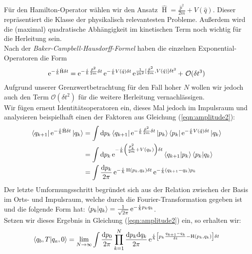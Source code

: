 Für den Hamilton-Operator wählen wir den Ansatz $\hat{\operatorname{H}} = \frac{\hat{p}^2}{2m} + V(\hat{q})$. Dieser repräsentiert die Klasse der physikalisch relevantesten Probleme. Außerdem wird die (maximal) quadratische Abhängigkeit im kinetischen Term noch wichtig für die Herleitung sein.\\
Nach der \textit{Baker-Campbell-Hausdorff-Formel} haben die einzelnen Exponential-Operatoren die Form
\begin{align}
	\operatorname{e}^{-\frac{i}{\hbar}\hat{\operatorname{H}}\delta t} = \operatorname{e}^{-\frac{i}{\hbar}\frac{\hat{p}^2}{2m}\delta t}\operatorname{e}^{-\frac{i}{\hbar} V(\hat{q})\delta t}\operatorname{e}^{\frac{1}{2\hbar^2}[\frac{\hat{p}^2}{2m},V(\hat{q})]\delta t^2} + \ \mathcal{O}(\delta t^3)
\end{align}
Aufgrund unserer Grenzwertbetrachtung für den Fall hoher $N$ wollen wir jedoch auch den Term $\mathcal{O}(\delta t^2)$ für die weitere Herleitung vernachlässigen. \\
Wir fügen erneut Identitätsoperatoren ein, dieses Mal jedoch im Impulsraum und analysieren beispielhaft einen der Faktoren aus Gleichung (\ref{eqn:amplitude2}):
\begin{align}
	\bra{q_{k+1}}\operatorname{e}^{-\frac{i}{\hbar}\hat{\operatorname{H}}\delta t}\ket{q_k} &= \int \dd p_k \bra{q_{k+1}}\operatorname{e}^{-\frac{i}{\hbar}\frac{\hat{p}^2}{2m}\delta t}\ket{p_k}\bra{p_k}\operatorname{e}^{-\frac{i}{\hbar} V(\hat{q})\delta t}\ket{q_k} \nonumber \\
	&= \int \dd p_k \operatorname{e}^{-\frac{i}{\hbar}\left(\frac{p_k^2}{2m} +V(q_k)\right)\delta t}\bra{q_{k+1}}\ket{p_k}\bra{p_k}\ket{q_k} \nonumber \\
	&= \int \frac{\dd p_k}{2\pi} \operatorname{e}^{-\frac{i}{\hbar} \operatorname{H}(p_k,q_k)\delta t} \operatorname{e}^{-\frac{i}{\hbar}(q_{k+1}-q_k)p_k}
\end{align}
Der letzte Umformungsschritt begründet sich aus der Relation zwischen der Basis im Orts- und Impulsraum, welche durch die Fourier-Transformation gegeben ist und die folgende Form hat: $\braket{p_k}{q_k} = \frac{1}{\sqrt{2\pi}} \operatorname{e}^{-\frac{i}{\hbar} p_kq_k}$. \\
Setzen wir dieses Ergebnis in Gleichung (\ref{eqn:amplitude2}) ein, so erhalten wir: 
\begin{align}
	\braket{q_b,T}{q_a,0} = \lim_{N\rightarrow\infty} \int \frac{\dd p_0}{2\pi} \prod_{k=1}^N \frac{\dd p_k\dd q_k}{2\pi} \operatorname{e}^{\frac{i}{\hbar}\left[p_k\frac{q_{k+1}-q_k}{\delta t} - \operatorname{H}(p_k,q_k)\right]\delta t}
\end{align}
